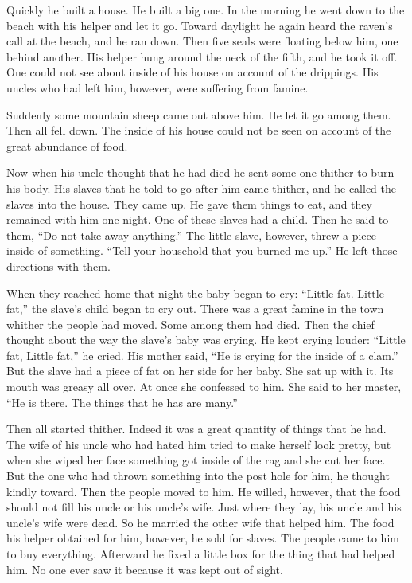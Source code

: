 Quickly he built a house.
He built a big one.
In the morning he went down to the beach with his helper and let it go.
Toward daylight he again heard the raven’s call at the beach, and he ran down.
Then five seals were floating below him, one behind another.
His helper hung around the neck of the fifth, and he took it off.
One could not see about inside of his house on account of the drippings.
His uncles who had left him, however, were suffering from famine.

Suddenly some mountain sheep came out above him.
He let it go among them.
Then all fell down.
The inside of his house could not be seen on account of the great abundance of food.

Now when his uncle thought that he had died he sent some one thither to burn his body.
His slaves that he told to go after him came thither, and he called the slaves into the house.
They came up.
He gave them things to eat, and they remained with him one night.
One of these slaves had a child.
Then he said to them, \qqk{}“Do not take away anything.” The little slave, however, threw a piece inside of something.
\qqk{}“Tell your household that you burned me up.” He left those directions with them.

When they reached home that night the baby began to cry: \qqk{}“Little fat.
Little fat,” the slave's child began to cry out.
There was a great famine in the town whither the people had moved.
Some among them had died.
Then the chief thought about the way the slave's baby was crying.
He kept crying louder: \qqk{}“Little fat, Little fat,” he cried.
His mother said, “He is crying for the inside of a clam.” But the slave had a piece of fat on her side for her baby.
She sat up with it.
Its mouth was greasy all over.
At once she confessed to him.
She said to her master, \qqk{}“He is there.
The things that he has are many.”

Then all started thither.
Indeed it was a great quantity of things that he had.
The wife of his uncle who had hated him tried to make herself look pretty, but when she wiped her face something got inside of the rag and she cut her face.
But the one who had thrown something into the post hole for him, he thought kindly toward.
Then the people moved to him.
He willed, however, that the food should not fill his uncle or his uncle’s wife.
Just where they lay, his uncle and his uncle’s wife were dead.
So he married the other wife that helped him.
The food his helper obtained for him, however, he sold for slaves.
The people came to him to buy everything.
Afterward he fixed a little box for the thing that had helped him.
No one ever saw it because it was kept out of sight.

